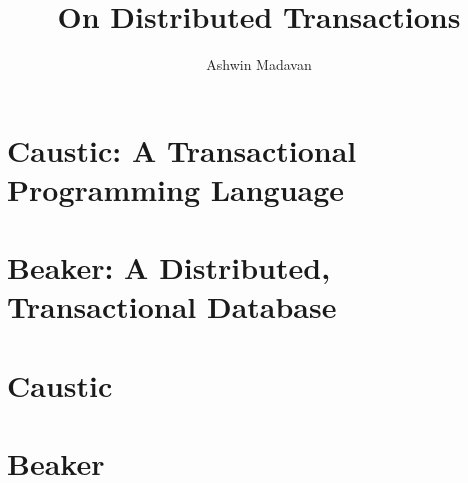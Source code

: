 \documentclass[12pt]{report}
\begin{document}
  \title{On Distributed Transactions}
  \author{Ashwin Madavan}
  \maketitle

  \begin{abstract}

  \end{abstract}

  \tableofcontents

  \chapter{Caustic: A Transactional Programming Language}
  

  \chapter{Beaker: A Distributed, Transactional Database}
  

  \appendix
  \chapter{Caustic}
  

  \chapter{Beaker}
  

  \printbibliography
\end{document}
